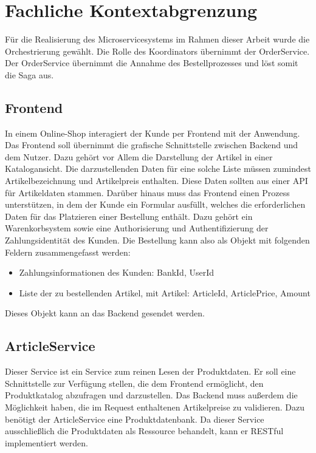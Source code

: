\section{Fachliche Kontextabgrenzung}

Für die Realisierung des Microservicesystems im Rahmen dieser Arbeit wurde die Orchestrierung gewählt. %
Die Rolle des Koordinators übernimmt der OrderService. Der OrderService übernimmt die Annahme des Bestellprozesses und löst somit die Saga aus. 

\subsection{Frontend}
In einem Online-Shop interagiert der Kunde per Frontend mit der Anwendung. Das Frontend soll übernimmt die grafische Schnittstelle zwischen Backend und dem Nutzer. Dazu gehört vor Allem die Darstellung der Artikel in einer Katalogansicht. Die darzustellenden Daten für eine solche Liste müssen zumindest Artikelbezeichnung und Artikelpreis enthalten. Diese Daten sollten aus einer API für Artikeldaten stammen. Darüber hinaus muss das Frontend einen Prozess unterstützen, in dem der Kunde ein Formular ausfüllt, welches die erforderlichen Daten für das Platzieren einer Bestellung enthält. Dazu gehört ein Warenkorbsystem sowie eine Authorisierung und Authentifizierung der Zahlungsidentität des Kunden. Die Bestellung kann also als Objekt mit folgenden Feldern zusammengefasst werden:
\begin{itemize}
	\item Zahlungsinformationen des Kunden: BankId, UserId
	\item Liste der zu bestellenden Artikel, mit Artikel: ArticleId, ArticlePrice, Amount
\end{itemize}

Dieses Objekt kann an das Backend gesendet werden. 

\subsection{ArticleService}
Dieser Service ist ein Service zum reinen Lesen der Produktdaten. Er soll eine Schnittstelle zur Verfügung stellen, die dem Frontend ermöglicht, den Produktkatalog abzufragen und darzustellen. Das Backend muss außerdem die Möglichkeit haben, die im Request enthaltenen Artikelpreise zu validieren. Dazu benötigt der ArticleService eine Produktdatenbank. Da dieser Service ausschließlich die Produktdaten als Ressource behandelt, kann er RESTful implementiert werden.

